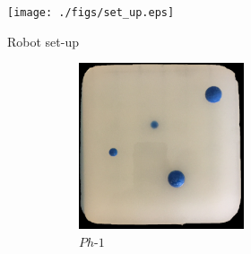 {\begin{figure}[]
	\centering
	\begin{subfigure}[b]{.448\textwidth}
		\centering
		\texttt{[image: ./figs/set\_up.eps]}
		\caption{Robot set-up}
		\label{exp:robot}
	\end{subfigure}
	\hspace{0.01\textwidth}
	\begin{subfigure}[b]{0.53\textwidth}
		\begin{subfigure}[b]{\textwidth}
			\centering
			\begin{subfigure}[b]{.45\textwidth}
				\includegraphics[width=\textwidth]{./figs/phantom.jpg}
				\caption{$Ph\text{-}1$}
				\label{ph1}
			\end{subfigure}
			\hspace{0.01\textwidth}
			\begin{subfigure}[b]{.46\textwidth}

\end{subfigure}
\end{subfigure}
\end{subfigure}
\end{figure}}
